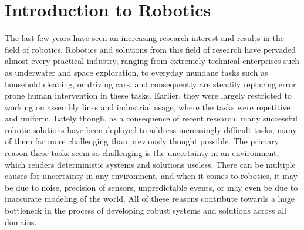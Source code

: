 
\section{Introduction to Robotics}
\label{sec:robo-intro}
The last few years have seen an increasing research interest and results in the field of robotics. Robotics and solutions from this field of
research have pervaded almost every practical industry, ranging from extremely technical enterprises such as underwater and space exploration, to
everyday mundane tasks such as household cleaning, or driving cars, and consequently are steadily replacing error prone human 
intervention in these tasks. Earlier, they were largely restricted to working on assembly lines and industrial usage, where the tasks were
repetitive and uniform. Lately though, as a consequence of recent research, many successful robotic solutions have been deployed to address 
increasingly difficult tasks, many of them far more challenging than previously thought possible. The primary reason these tasks seem so
challenging is the uncertainty in an environment, which renders deterministic systems and solutions useless. There can be multiple causes for
uncertainty in any environment, and when it comes to robotics, it may be due to noise, precision of sensors, unpredictable events, or may even be 
due to inaccurate modeling of the world. All of these reasons contribute towards a huge bottleneck in the process of developing robust systems
and solutions across all domains. 

